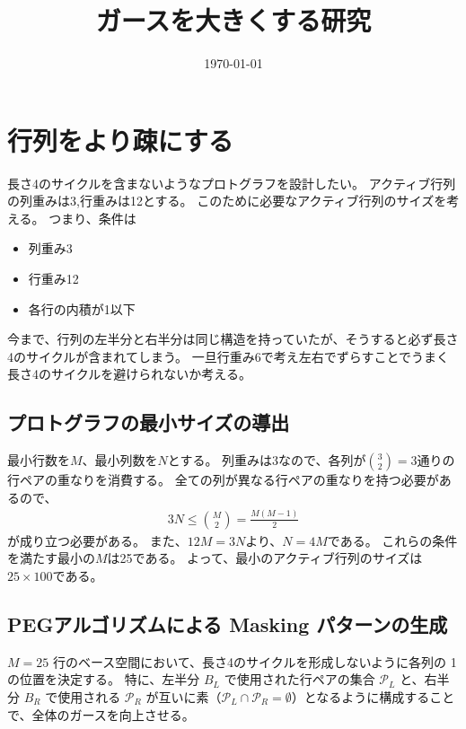 \documentclass[a4paper,11pt,dvipdfmx]{jsarticle}
\theoremstyle{definition}
\begin{document}
\title{ガースを大きくする研究}
\author{}
\date{\today}
\maketitle
\tableofcontents
\clearpage
\section{行列をより疎にする}
長さ4のサイクルを含まないようなプロトグラフを設計したい。
アクティブ行列の列重みは3,行重みは12とする。
このために必要なアクティブ行列のサイズを考える。
つまり、条件は
\begin{itemize}
  \item 列重み3
  \item 行重み12
  \item 各行の内積が1以下
\end{itemize}
今まで、行列の左半分と右半分は同じ構造を持っていたが、そうすると必ず長さ4のサイクルが含まれてしまう。
一旦行重み6で考え左右でずらすことでうまく長さ4のサイクルを避けられないか考える。
\subsection{プロトグラフの最小サイズの導出}
最小行数を$M$、最小列数を$N$とする。
列重みは3なので、各列が$\binom{3}{2} = 3$通りの行ペアの重なりを消費する。
全ての列が異なる行ペアの重なりを持つ必要があるので、
\begin{align}
  3N \leq \binom{M}{2} = \frac{M(M-1)}{2}
\end{align}
が成り立つ必要がある。
また、$12M=3N$より、$N=4M$である。
これらの条件を満たす最小の$M$は25である。
よって、最小のアクティブ行列のサイズは$25 \times 100$である。

\subsection{PEGアルゴリズムによる Masking パターンの生成}
$M=25$ 行のベース空間において、長さ4のサイクルを形成しないように各列の 1 の位置を決定する。
特に、左半分 $B_L$ で使用された行ペアの集合 $\mathcal{P}_L$ と、右半分 $B_R$ で使用される $\mathcal{P}_R$ が互いに素（$\mathcal{P}_L \cap \mathcal{P}_R = \emptyset$）となるように構成することで、全体のガースを向上させる。

\end{document}
